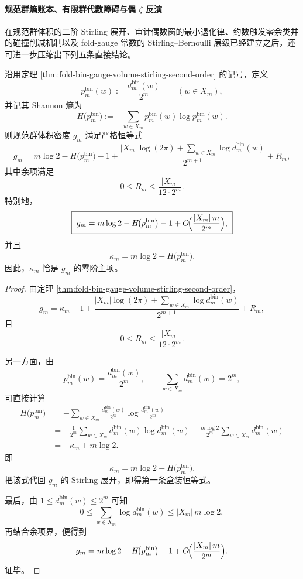 \paragraph{规范群熵账本、有限群代数障碍与偶 \texorpdfstring{$\zeta$}{zeta} 反演}
在规范群体积的二阶 Stirling 展开、审计偶数窗的最小退化律、约数触发零余类并的碰撞削减机制以及 fold-gauge 常数的 Stirling--Bernoulli 层级已经建立之后，还可进一步压缩出下列五条直接结论。

\begin{theorem}[规范群熵的精确账本恒等式]\label{thm:xi-time-part60aa-gauge-entropy-ledger-exact-identity}
沿用定理 \ref{thm:fold-bin-gauge-volume-stirling-second-order} 的记号，定义
\[
p_m^{\mathrm{bin}}(w):=\frac{d_m^{\mathrm{bin}}(w)}{2^m}
\qquad (w\in X_m),
\]
并记其 Shannon 熵为
\[
H\!\bigl(p_m^{\mathrm{bin}}\bigr):=
-\sum_{w\in X_m}p_m^{\mathrm{bin}}(w)\log p_m^{\mathrm{bin}}(w).
\]
则规范群体积密度 \(g_m\) 满足严格恒等式
\[
\boxed{\;
g_m
=
m\log 2
-H\!\bigl(p_m^{\mathrm{bin}}\bigr)
-1
+\frac{|X_m|\log(2\pi)+\sum_{w\in X_m}\log d_m^{\mathrm{bin}}(w)}{2^{m+1}}
+R_m,\;}
\]
其中余项满足
\[
\boxed{\;
0\le R_m\le \frac{|X_m|}{12\cdot 2^m}.\;}
\]
特别地，
\[
\boxed{\;
g_m
=
m\log 2
-H\!\bigl(p_m^{\mathrm{bin}}\bigr)
-1
+O\!\Bigl(\frac{|X_m|\,m}{2^m}\Bigr),\;}
\]
并且
\[
\boxed{\;
\kappa_m=m\log 2-H\!\bigl(p_m^{\mathrm{bin}}\bigr).\;}
\]
因此，\(\kappa_m\) 恰是 \(g_m\) 的零阶主项。
\end{theorem}
\begin{proof}
由定理 \ref{thm:fold-bin-gauge-volume-stirling-second-order}，
\[
g_m
=
\kappa_m-1+\frac{|X_m|\log(2\pi)+\sum_{w\in X_m}\log d_m^{\mathrm{bin}}(w)}{2^{m+1}}
+R_m,
\]
且
\[
0\le R_m\le \frac{|X_m|}{12\cdot 2^m}.
\]

另一方面，由
\[
p_m^{\mathrm{bin}}(w)=\frac{d_m^{\mathrm{bin}}(w)}{2^m},
\qquad
\sum_{w\in X_m}d_m^{\mathrm{bin}}(w)=2^m,
\]
可直接计算
\[
\begin{aligned}
H\!\bigl(p_m^{\mathrm{bin}}\bigr)
&=
-\sum_{w\in X_m}\frac{d_m^{\mathrm{bin}}(w)}{2^m}
\log\frac{d_m^{\mathrm{bin}}(w)}{2^m}\\
&=
-\frac{1}{2^m}\sum_{w\in X_m}d_m^{\mathrm{bin}}(w)\log d_m^{\mathrm{bin}}(w)
+\frac{m\log 2}{2^m}\sum_{w\in X_m}d_m^{\mathrm{bin}}(w)\\
&=
-\kappa_m+m\log 2.
\end{aligned}
\]
即
\[
\kappa_m=m\log 2-H\!\bigl(p_m^{\mathrm{bin}}\bigr).
\]
把该式代回 \(g_m\) 的 Stirling 展开，即得第一条盒装恒等式。

最后，由 \(1\le d_m^{\mathrm{bin}}(w)\le 2^m\) 可知
\[
0\le \sum_{w\in X_m}\log d_m^{\mathrm{bin}}(w)\le |X_m|\,m\log 2,
\]
再结合余项界，便得到
\[
g_m
=
m\log 2-H\!\bigl(p_m^{\mathrm{bin}}\bigr)-1
+O\!\Bigl(\frac{|X_m|\,m}{2^m}\Bigr).
\]
证毕。
\end{proof}

